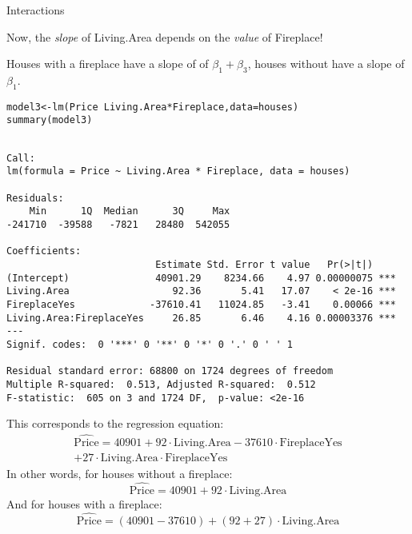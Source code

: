 \documentclass{beamer}\usepackage[]{graphicx}\usepackage[]{color}
\makeatletter
\newcommand{\hlopt}[1]{\textcolor[rgb]{1,0.894,0.769}{#1}}%
\newcommand{\hlstd}[1]{\textcolor[rgb]{1,0.894,0.769}{#1}}%
\newcommand{\hlkwb}[1]{\textcolor[rgb]{0.804,0.776,0.451}{#1}}%
\newcommand{\hlkwc}[1]{\textcolor[rgb]{0.78,0.941,0.545}{#1}}%
\newcommand{\hlkwd}[1]{\textcolor[rgb]{1,0.78,0.769}{#1}}%
\newenvironment{kframe}{%
 \def\at@end@of@kframe{}%
 \ifinner\ifhmode%
  \def\at@end@of@kframe{\end{minipage}}%
  \begin{minipage}{\columnwidth}%
 \fi\fi%
 \def\FrameCommand##1{\hskip\@totalleftmargin \hskip-\fboxsep
 \colorbox{shadecolor}{##1}\hskip-\fboxsep
     \hskip-\linewidth \hskip-\@totalleftmargin \hskip\columnwidth}%
 \MakeFramed {\advance\hsize-\width
   \@totalleftmargin\z@ \linewidth\hsize
   \@setminipage}}%
 {\par\unskip\endMakeFramed%
 \at@end@of@kframe}
\newenvironment{knitrout}{}{} %
\makeatother
\begin{document}
\begin{darkframes}
\begin{frame}{Interactions}
      \pause\bigskip

      Now, the \emph{slope} of Living.Area depends on the \emph{value} of Fireplace!

      \bigskip
      Houses with a fireplace have a slope of of $\beta_1+\beta_3$, houses without have a slope of $\beta_1$.
    \end{frame}

    \begin{frame}[fragile]
      \fontsize{8}{8}\selectfont
\begin{knitrout}
\begin{kframe}
\begin{alltt}
\hlstd{model3} \hlkwb{<-} \hlkwd{lm}\hlstd{(Price} \hlopt{~} \hlstd{Living.Area} \hlopt{*} \hlstd{Fireplace,} \hlkwc{data}\hlstd{=houses)}
\hlkwd{summary}\hlstd{(model3)}
\end{alltt}
\begin{verbatim}

Call:
lm(formula = Price ~ Living.Area * Fireplace, data = houses)

Residuals:
    Min      1Q  Median      3Q     Max 
-241710  -39588   -7821   28480  542055 

Coefficients:
                          Estimate Std. Error t value   Pr(>|t|)    
(Intercept)               40901.29    8234.66    4.97 0.00000075 ***
Living.Area                  92.36       5.41   17.07    < 2e-16 ***
FireplaceYes             -37610.41   11024.85   -3.41    0.00066 ***
Living.Area:FireplaceYes     26.85       6.46    4.16 0.00003376 ***
---
Signif. codes:  0 '***' 0 '**' 0 '*' 0 '.' 0 ' ' 1

Residual standard error: 68800 on 1724 degrees of freedom
Multiple R-squared:  0.513,	Adjusted R-squared:  0.512 
F-statistic:  605 on 3 and 1724 DF,  p-value: <2e-16
\end{verbatim}
\end{kframe}
\end{knitrout}
    \end{frame}

    \begin{frame}
      This corresponds to the regression equation:
      \begin{multline*}
        \widehat{\text{Price}} = 40901
          + 92 \cdot\text{Living.Area}
          - 37610 \cdot\text{FireplaceYes} \\
          + 27 \cdot\text{Living.Area}\cdot\text{FireplaceYes}
      \end{multline*}
      \pause
      In other words, for houses without a fireplace:
      \[
        \widehat{\text{Price}} = 40901
        + 92 \cdot\text{Living.Area}
      \]
      \pause
      And for houses with a fireplace:
      \[
        \widehat{\text{Price}} = (40901 - 37610)
        + (92 + 27) \cdot\text{Living.Area}
      \]
    \end{frame}


\end{darkframes}
\end{document}
